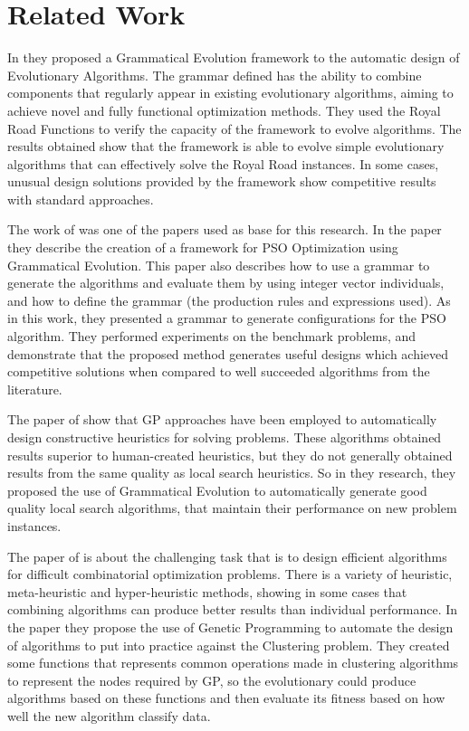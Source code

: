 \documentclass[journal]{IEEEtran}
\begin{document}
	
	
	\section{Related Work} \label{sec:related_work}
	
	In \cite{lourencco2012evolving} they proposed a Grammatical Evolution framework to the automatic design of Evolutionary Algorithms. The grammar defined has the ability to combine components that regularly appear in existing evolutionary algorithms, aiming to achieve novel and fully functional optimization methods. They used the Royal Road Functions to verify the capacity of the framework to evolve algorithms. The results obtained show that the framework is able to evolve simple evolutionary algorithms that can effectively solve the Royal Road instances. In some cases, unusual design solutions provided by the framework show competitive results with standard approaches.
	
	The work of \cite{miranda2015gefpso} was one of the papers used as base for this research. In the paper they describe the creation of a framework for PSO Optimization using Grammatical Evolution. This paper also describes how to use a grammar to generate the algorithms and evaluate them by using integer vector individuals, and how to define the grammar (the production rules and expressions used). As in this work, they presented a grammar to generate configurations for the PSO algorithm. They performed experiments on the benchmark problems, and demonstrate that the proposed method generates useful designs which achieved competitive solutions when compared to well succeeded algorithms from the literature.
	
	The paper of \cite{burke2012grammatical} show that GP approaches have been employed to automatically design constructive heuristics for solving problems. These algorithms obtained results superior to human-created heuristics, but they do not generally obtained results from the same quality as local search heuristics. So in they research, they proposed the use of Grammatical Evolution to automatically generate good quality local search algorithms, that maintain their performance on new problem instances.
		
	The paper of \cite{bolton2015optimizing} is about the challenging task that is to design efficient algorithms for difficult combinatorial optimization problems. There is a variety of heuristic, meta-heuristic and hyper-heuristic methods, showing in some cases that combining algorithms can produce better results than individual performance. In the paper they propose the use of Genetic Programming to automate the design of algorithms to put into practice against the Clustering problem. They created some functions that represents common operations made in clustering algorithms to represent the nodes required by GP, so the evolutionary could produce algorithms based on these functions and then evaluate its fitness based on how well the new algorithm classify data.
		
\end{document}
